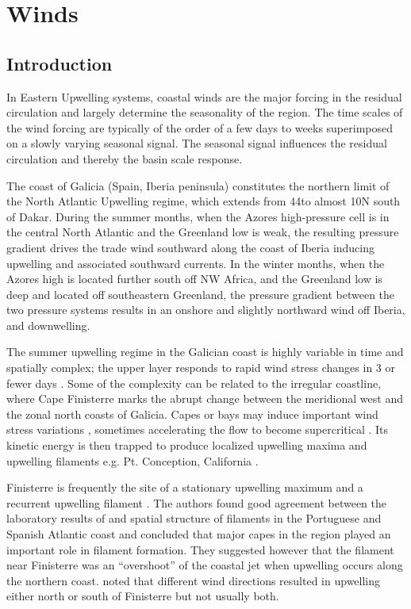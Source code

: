 \chapter{Winds}\label{ch:winds}
\section{Introduction}
In Eastern Upwelling systems, coastal winds are the major forcing
in the residual circulation and largely determine the seasonality
of the region. The time scales of the wind forcing are typically
of the order of a few days to weeks superimposed on a slowly
varying seasonal signal. The seasonal signal influences the
residual circulation and thereby the basin scale response.

The coast of Galicia (Spain, Iberia peninsula) constitutes the
northern limit of the North Atlantic Upwelling regime, which
extends from 44\deg to almost 10\deg N south of Dakar. During the
summer months, when the Azores high-pressure cell is in the
central North Atlantic and the Greenland low is weak, the
resulting pressure gradient drives the trade wind southward along
the coast of Iberia inducing upwelling and associated southward
currents. In the winter months, when the Azores high is located
further south off NW Africa, and the Greenland low is deep and
located off southeastern Greenland, the pressure gradient between
the two pressure systems results in an onshore and slightly
northward wind off Iberia, and downwelling.

The summer upwelling regime in the Galician coast is highly
variable in time and spatially complex; the upper layer responds
to rapid wind stress changes in 3 or fewer days
\citep{Mcclain86,Huthnance02}. Some of the complexity can be
related to the irregular coastline, where Cape Finisterre marks
the abrupt change between the meridional west and the zonal north
coasts of Galicia. Capes or bays may induce important wind stress
variations \citep{Enriquez95}, sometimes accelerating the flow to
become supercritical \citep{Winant88}. Its kinetic energy is then
trapped to produce localized upwelling maxima and upwelling
filaments e.g. Pt. Conception, California \citep{Barth87}.

Finisterre is frequently the site of a stationary upwelling
maximum \citep{Blanton84,Castro94} and a recurrent upwelling
filament \citep{Haynes93}. The authors found good agreement
between the laboratory results of \citet{Narimousa89} and spatial
structure of filaments in the Portuguese and Spanish Atlantic
coast and concluded that major capes in the region played an
important role in filament formation. They suggested however that
the filament near Finisterre was an ``overshoot'' of the coastal
jet when upwelling occurs along the northern coast.
\citet{Mcclain86} noted that different wind directions resulted in
upwelling either north or south of Finisterre but not usually
both.

